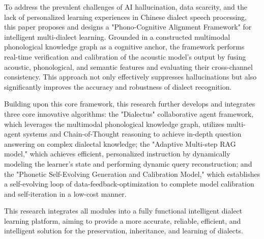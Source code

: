 

\begin{abstract}
针对中文方言语音处理中普遍存在的AI幻觉、数据稀缺及个性化学习体验缺失等挑战，本文提出并设计了一个面向多方言智能学习的“声学多模态认知校准框架”。该框架以构建的多模态方言音系知识图谱为认知锚点，通过融合声学、音系与语义特征并进行跨通道一致性评估，对声学模型的输出进行实时验证与校准，从而在有效抑制幻觉的同时，显著提升方言识别的准确率与鲁棒性。

在此核心框架之上，本项目进一步研发并集成了三个核心创新算法：“文脉智能体协作框架 (Dialectus)”基于多模态方言音系知识图谱，运用多智能体与思维链推理，实现了对复杂方言知识的深度问答；“自适应多步检索生成模型”通过动态建模学习者状态，动态查询重构，实现了高效的个性化教学；“音系自进化生成与校准模型”则构建了数据-反馈-优化的自进化闭环，以低成本方式完成了模型校准与自我迭代。

本项目将所有模块整合为一个功能完备的方言智能学习平台，旨在为方言的保护、传承与学习提供一个更准确、可靠、高效且智能化的解决方案。
\end{abstract}


\begin{abstract*}
To address the prevalent challenges of AI hallucination, data scarcity, and the lack of personalized learning experiences in Chinese dialect speech processing, this paper proposes and designs a "Phono-Cognitive Alignment Framework" for intelligent multi-dialect learning. Grounded in a constructed multimodal phonological knowledge graph as a cognitive anchor, the framework performs real-time verification and calibration of the acoustic model's output by fusing acoustic, phonological, and semantic features and evaluating their cross-channel consistency. This approach not only effectively suppresses hallucinations but also significantly improves the accuracy and robustness of dialect recognition.

Building upon this core framework, this research further develops and integrates three core innovative algorithms: the "Dialectus" collaborative agent framework, which leverages the multimodal phonological knowledge graph, utilizes multi-agent systems and Chain-of-Thought reasoning to achieve in-depth question answering on complex dialectal knowledge; the "Adaptive Multi-step RAG model," which achieves efficient, personalized instruction by dynamically modeling the learner's state and performing dynamic query reconstruction; and the "Phonetic Self-Evolving Generation and Calibration Model," which establishes a self-evolving loop of data-feedback-optimization to complete model calibration and self-iteration in a low-cost manner.

This research integrates all modules into a fully functional intelligent dialect learning platform, aiming to provide a more accurate, reliable, efficient, and intelligent solution for the preservation, inheritance, and learning of dialects.
\end{abstract*}
